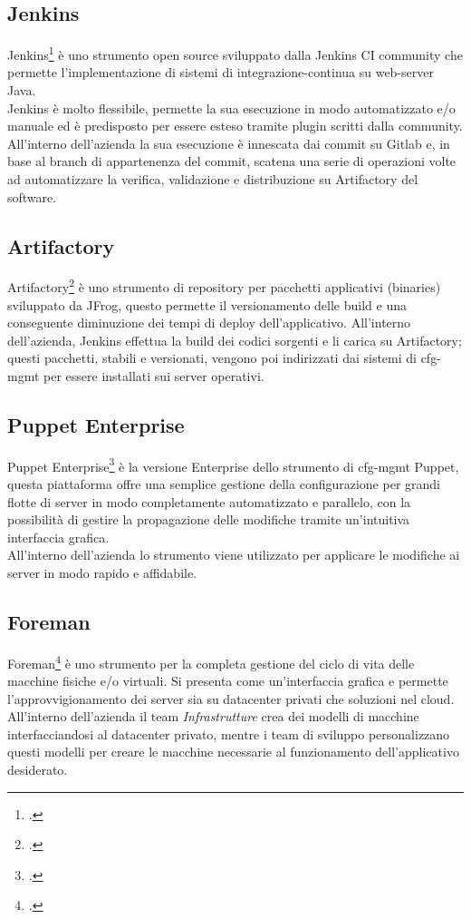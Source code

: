 \subsection{Jenkins}
Jenkins\footcite{site:jenkins} è uno strumento open source sviluppato dalla Jenkins CI community che permette l'implementazione di sistemi di \gls{integrazione-continua} su web-server Java. \\
Jenkins è molto flessibile, permette la sua esecuzione in modo automatizzato e/o manuale ed è predisposto per essere esteso tramite \gls{plugin} scritti dalla community. \\
All'interno dell'azienda la sua esecuzione è innescata dai commit su Gitlab e, in base al \gls{branch} di appartenenza del commit, scatena una serie di operazioni volte ad automatizzare la verifica, validazione e distribuzione su Artifactory del software.
\subsection{Artifactory}
Artifactory\footcite{site:artifactory} è uno strumento di repository per pacchetti applicativi (binaries) sviluppato da JFrog, questo permette il versionamento delle \gls{build} e una conseguente diminuzione dei tempi di \gls{deploy} dell'applicativo.
All'interno dell'azienda, Jenkins effettua la \gls{build} dei codici sorgenti e li carica su Artifactory; questi pacchetti, stabili e versionati, vengono poi indirizzati dai sistemi di \gls{cfg-mgmt} per essere installati sui server operativi.
\subsection{Puppet Enterprise}
Puppet Enterprise\footcite{site:puppet} è la versione Enterprise dello strumento di \gls{cfg-mgmt} Puppet, questa piattaforma offre una semplice gestione della configurazione per grandi flotte di server in modo completamente automatizzato e parallelo, con la possibilità di gestire la propagazione delle modifiche tramite un'intuitiva interfaccia grafica.\\
All'interno dell'azienda lo strumento viene utilizzato per applicare le modifiche ai server in modo rapido e affidabile.
\subsection{Foreman}
Foreman\footcite{site:foreman} è uno strumento per la completa gestione del ciclo di vita delle macchine fisiche e/o virtuali. Si presenta come un'interfaccia grafica e permette l'approvvigionamento dei server sia su \gls{datacenter} privati che soluzioni nel \gls{cloud}. \\
All'interno dell'azienda il team \textit{Infrastrutture} crea dei modelli di macchine interfacciandosi al \gls{datacenter} privato, mentre i team di sviluppo personalizzano questi modelli per creare le macchine necessarie al funzionamento dell'applicativo desiderato.
